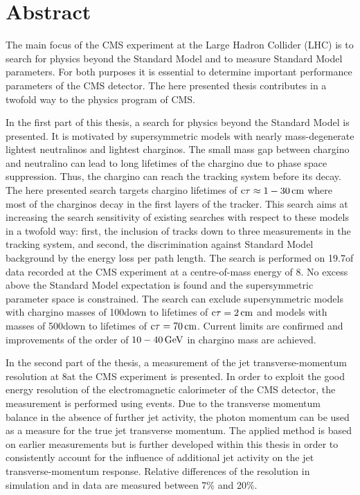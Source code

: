\chapter*{Abstract}

The main focus of the CMS experiment at the Large Hadron Collider (LHC) is to search for physics beyond the Standard Model and to measure Standard Model parameters.
For both purposes it is essential to determine important performance parameters of the CMS detector.
The here presented thesis contributes in a twofold way to the physics program of CMS.

In the first part of this thesis, a search for physics beyond the Standard Model is presented.
It is motivated by supersymmetric models with nearly mass-degenerate lightest neutralinos and lightest charginos.
The small mass gap between chargino and neutralino can lead to long lifetimes of the chargino due to phase space suppression.
Thus, the chargino can reach the tracking system before its decay.
The here presented search targets chargino lifetimes of $\text{c}\tau \approx 1 - 30\,\text{cm} $ where most of the charginos decay in the first layers of the tracker. 
This search aims at increasing the search sensitivity of existing searches with respect to these models in a twofold way: first, the inclusion of tracks down to three measurements in the tracking system, and second, the discrimination against Standard Model background by the energy loss per path length.
The search is performed on 19.7\fbinv of data recorded at the CMS experiment at a centre-of-mass energy of 8\tev.
No excess above the Standard Model expectation is found and the supersymmetric parameter space is constrained.
The search can exclude supersymmetric models with chargino masses of 100\gev down to lifetimes of $\text{c}\tau=2\,\text{cm}$ and models with masses of 500\gev down to lifetimes of $\text{c}\tau=70\,\text{cm}$.
Current limits are confirmed and improvements of the order of $10-40\,\text{Ge}\kern-0.06667em\text{V}$ in chargino mass are achieved.

In the second part of the thesis, a measurement of the jet transverse-momentum resolution at 8\tev at the CMS experiment is presented.
In order to exploit the good energy resolution of the electromagnetic calorimeter of the CMS detector, the measurement is performed using \GAMJET events.
Due to the transverse momentum balance in the absence of further jet activity, the photon momentum can be used as a measure for the true jet transverse momentum. 
The applied method is based on earlier measurements but is further developed within this thesis in order to consistently account for the influence of additional jet activity on the jet transverse-momentum response.
Relative differences of the resolution in simulation and in data are measured between 7\% and 20\%. 

\clearpage
